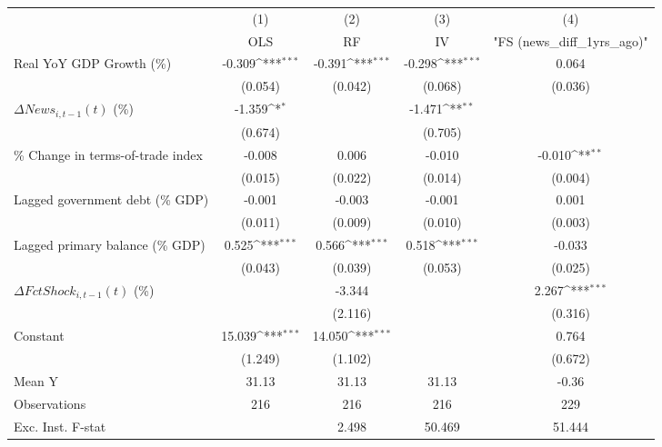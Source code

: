 {
\def\sym#1{\ifmmode^{#1}\else\(^{#1}\)\fi}
\begin{tabular}{l*{4}{c}}
\toprule
                    &\multicolumn{1}{c}{(1)}&\multicolumn{1}{c}{(2)}&\multicolumn{1}{c}{(3)}&\multicolumn{1}{c}{(4)}\\
                    &\multicolumn{1}{c}{OLS}&\multicolumn{1}{c}{RF}&\multicolumn{1}{c}{IV}&\multicolumn{1}{c}{ "FS (news_diff_1yrs_ago)" }\\
\midrule
Real YoY GDP Growth (\%)&      -0.309\sym{***}&      -0.391\sym{***}&      -0.298\sym{***}&       0.064         \\
                    &     (0.054)         &     (0.042)         &     (0.068)         &     (0.036)         \\
\addlinespace
$ \Delta News_{i,t-1}(t)$ (\%)&      -1.359\sym{*}  &                     &      -1.471\sym{**} &                     \\
                    &     (0.674)         &                     &     (0.705)         &                     \\
\addlinespace
\% Change in terms-of-trade index&      -0.008         &       0.006         &      -0.010         &      -0.010\sym{**} \\
                    &     (0.015)         &     (0.022)         &     (0.014)         &     (0.004)         \\
\addlinespace
Lagged government debt (\% GDP)&      -0.001         &      -0.003         &      -0.001         &       0.001         \\
                    &     (0.011)         &     (0.009)         &     (0.010)         &     (0.003)         \\
\addlinespace
Lagged primary balance (\% GDP)&       0.525\sym{***}&       0.566\sym{***}&       0.518\sym{***}&      -0.033         \\
                    &     (0.043)         &     (0.039)         &     (0.053)         &     (0.025)         \\
\addlinespace
$ \Delta FctShock_{i,t-1}(t)$ (\%)&                     &      -3.344         &                     &       2.267\sym{***}\\
                    &                     &     (2.116)         &                     &     (0.316)         \\
\addlinespace
Constant            &      15.039\sym{***}&      14.050\sym{***}&                     &       0.764         \\
                    &     (1.249)         &     (1.102)         &                     &     (0.672)         \\
\midrule
Mean Y              &       31.13         &       31.13         &       31.13         &       -0.36         \\
Observations        &         216         &         216         &         216         &         229         \\
Exc. Inst. F-stat   &                     &       2.498         &      50.469         &      51.444         \\
\bottomrule
\end{tabular}
}
